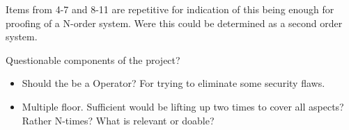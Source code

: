\documentclass{article}
\begin{document}
Items from 4-7 and 8-11 are repetitive for indication of this being enough for proofing of a N-order system. Were this could be determined as a second order system.

\pagebreak

Questionable components of the project?
\begin{itemize}
	\item Should the be a Operator? For trying to eliminate some security flaws.
	\item Multiple floor. Sufficient would be lifting up two times to cover all aspects? Rather N-times?  What is relevant or doable?
\end{itemize}
\end{document}
